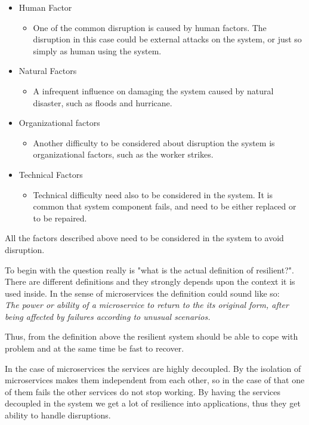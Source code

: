 \begin{itemize}
	\item Human Factor
	\begin{itemize}
		\item One of the common disruption is caused by human factors. The disruption in this case could be external attacks on the system, or just so simply as human using the system.  
	\end{itemize}
	\item Natural Factors
	\begin{itemize}
		\item A infrequent influence on damaging the system caused by natural disaster, such as floods and hurricane. 
	\end{itemize}
	\item Organizational factors
	\begin{itemize}
		\item Another difficulty to be considered about disruption the system is organizational factors, such as the worker strikes.   
	\end{itemize}
	\item Technical Factors
	\begin{itemize}
		\item Technical difficulty need also to be considered in the system. It is common that system component fails, and need to be either replaced or to be repaired.   
	\end{itemize}	
\end{itemize}

All the factors described above need to be considered in the system to avoid disruption. 

To begin with the question really is "what is the actual definition of resilient?". There are different definitions and they strongly depends upon the context it is used inside. In the sense of microservices the definition could sound like so:\\
\textit{The power or ability of a microservice to return to the its original form, after being affected by failures according to unusual scenarios.}

Thus, from the definition above the resilient system should be able to cope with problem and at the same time be fast to recover. 

In the case of microservices the services are highly decoupled. By the isolation of microservices makes them independent from each other, so in the case of that one of them fails the other services do not stop working. By having the services decoupled in the system we get a lot of resilience into applications, thus they get ability to handle disruptions. 

